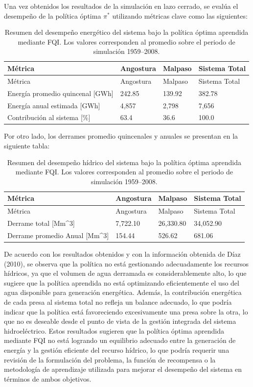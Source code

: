 \documentclass[
  letterpaper,
  DIV=11,
  numbers=noendperiod]{scrreprt}
\theoremstyle{definition}
\theoremstyle{remark}
\begin{document}
Una vez obtenidos los resultados de la simulación en lazo cerrado, se
evalúa el desempeño de la política óptima \(\pi^*\) utilizando métricas
clave como las siguientes:

\begin{longtable}[]{@{}llll@{}}
\caption{Resumen del desempeño energético del sistema bajo la política
óptima aprendida mediante FQI. Los valores corresponden al promedio
sobre el periodo de simulación
1959--2008.}\label{tbl-desempeno-energetico}\tabularnewline
\toprule\noalign{}
Métrica & Angostura & Malpaso & Sistema Total \\
\midrule\noalign{}
\endfirsthead
\toprule\noalign{}
Métrica & Angostura & Malpaso & Sistema Total \\
\midrule\noalign{}
\endhead
\bottomrule\noalign{}
\endlastfoot
Energía promedio quincenal {[}GWh{]} & 242.85 & 139.92 & 382.78 \\
Energía anual estimada {[}GWh{]} & 4,857 & 2,798 & 7,656 \\
Contribución al sistema {[}\%{]} & 63.4 & 36.6 & 100.0 \\
\end{longtable}

Por otro lado, los derrames promedio quincenales y anuales se presentan
en la siguiente tabla:

\begin{longtable}[]{@{}llll@{}}
\caption{Resumen del desempeño hídrico del sistema bajo la política
óptima aprendida mediante FQI. Los valores corresponden al promedio
sobre el periodo de simulación
1959--2008.}\label{tbl-desempeno-hidrico}\tabularnewline
\toprule\noalign{}
Métrica & Angostura & Malpaso & Sistema Total \\
\midrule\noalign{}
\endfirsthead
\toprule\noalign{}
Métrica & Angostura & Malpaso & Sistema Total \\
\midrule\noalign{}
\endhead
\bottomrule\noalign{}
\endlastfoot
Derrame total {[}Mm\^{}3{]} & 7,722.10 & 26,330.80 & 34,052.90 \\
Derrame promedio Anual {[}Mm\^{}3{]} & 154.44 & 526.62 & 681.06 \\
\end{longtable}

De acuerdo con los resultados obtenidos y con la información obtenida de
Díaz (2010), se observa que la política no está gestionando
adecuadamente los recursos hídricos, ya que el volumen de agua derramada
es considerablemente alto, lo que sugiere que la política aprendida no
está optimizando eficientemente el uso del agua disponible para
generación energética. Además, la contribución energética de cada presa
al sistema total no refleja un balance adecuado, lo que podría indicar
que la política está favoreciendo excesivamente una presa sobre la otra,
lo que no es deseable desde el punto de vista de la gestión integrada
del sistema hidroeléctrico. Estos resultados sugieren que la política
óptima aprendida mediante FQI no está logrando un equilibrio adecuado
entre la generación de energía y la gestión eficiente del recurso
hídrico, lo que podría requerir una revisión de la formulación del
problema, la función de recompensa o la metodología de aprendizaje
utilizada para mejorar el desempeño del sistema en términos de ambos
objetivos.
\end{document}

